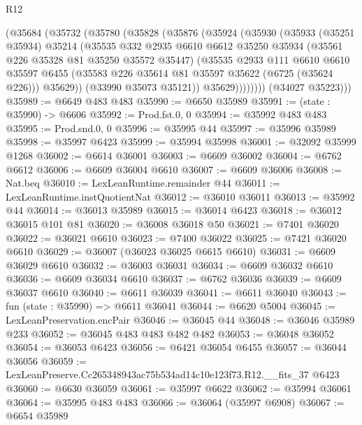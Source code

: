\begin{lexlean}{R12}
\begin{coremodule}
          (@35684
            (@35732
              (@35780
                (@35828
                  (@35876
                    (@35924
                      (@35930
                        (@35933
                          (@35251 @35934)
                          @35214
                          (@35535
                            @332
                            @2935
                            @6610
                            @6612
                            @35250
                            @35934
                            (@35561 @226 @35328 @81 @35250 @35572 @35447)
                            (@35535
                              @2933
                              @111
                              @6610
                              @6610
                              @35597
                              @6455
                              (@35583 @226 @35614 @81 @35597 @35622 (@6725 (@35624 @226)))
                              @35629))
                          (@33990 @35073 @35121))
                        @35629))))))))
        (@34027 @35223)))
@35989 := @6649 @483 @483
@35990 := @6650 @35989
@35991 := (state : @35990) -> @6606
@35992 := Prod.fst.{0, 0}
@35994 := @35992 @483 @483
@35995 := Prod.snd.{0, 0}
@35996 := @35995 @44
@35997 := @35996 @35989
@35998 := @35997 @6423
@35999 := @35994 @35998
@36001 := @32092 @35999 @1268
@36002 := @6614 @36001
@36003 := @6609 @36002
@36004 := @6762 @6612
@36006 := @6609 @36004 @6610
@36007 := @6609 @36006
@36008 := Nat.beq
@36010 := LexLeanRuntime.remainder @44
@36011 := LexLeanRuntime.instQuotientNat
@36012 := @36010 @36011
@36013 := @35992 @44
@36014 := @36013 @35989
@36015 := @36014 @6423
@36018 := @36012 @36015 @101 @81
@36020 := @36008 @36018 @50
@36021 := @7401 @36020
@36022 := @36021 @6610
@36023 := @7400 @36022
@36025 := @7421 @36020 @6610
@36029 := @36007 (@36023 @36025 @6615 @6610)
@36031 := @6609 @36029 @6610
@36032 := @36003 @36031
@36034 := @6609 @36032 @6610
@36036 := @6609 @36034 @6610
@36037 := @6762 @36036
@36039 := @6609 @36037 @6610
@36040 := @6611 @36039
@36041 := @6611 @36040
@36043 := fun (state : @35990) => @6611 @36041
@36044 := @6620 @5004
@36045 := LexLeanPreservation.encPair
@36046 := @36045 @44
@36048 := @36046 @35989 @233
@36052 := @36045 @483 @483 @482 @482
@36053 := @36048 @36052
@36054 := @36053 @6423
@36056 := @6421 @36054 @6455
@36057 := @36044 @36056
@36059 := LexLeanPreserve.Cc265348943ac75b534ad14c10e123f73.R12.__fits_37 @6423
@36060 := @6630 @36059
@36061 := @35997 @6622
@36062 := @35994 @36061
@36064 := @35995 @483 @483
@36066 := @36064 (@35997 @6908)
@36067 := @6654 @35989

\end{coremodule}
\end{lexlean}
